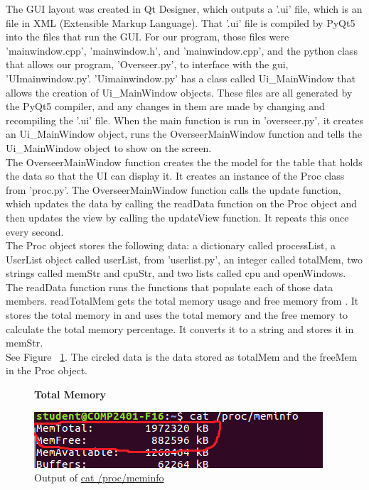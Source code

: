 \documentclass[12pt]{article}
\begin{document}
The GUI layout was created in Qt Designer, which outputs a '.ui' file, which is an file in XML (Extensible Markup Language).
That '.ui' file is compiled by PyQt5 into the files that run the GUI.
For our program, those files were 'mainwindow.cpp', 'mainwindow.h', and 'mainwindow.cpp', and the python class that allows our program, 'Overseer.py', to interface with the gui, 'UImainwindow.py'.
'Uimainwindow.py' has a class called Ui\_MainWindow that allows the creation of Ui\_MainWindow objects.
These files are all generated by the PyQt5 compiler, and any changes in them are made by changing and recompiling the '.ui' file.
When the main function is run in 'overseer.py', it creates an Ui\_MainWindow object, runs the OverseerMainWindow function and tells the Ui\_MainWindow object to show on the screen.\\
The OverseerMainWindow function creates the the model for the table that holds the data so that the UI can display it.
It creates an instance of the Proc class from 'proc.py'.
The OverseerMainWindow function calls the update function, which updates the data by calling the readData function on the Proc object and then updates the view by calling the updateView function.
It repeats this once every second.\\
The Proc object stores the following data: a dictionary called processList, a UserList object called userList, from 'userlist.py', an integer called totalMem, two strings called memStr and cpuStr, and two lists called cpu and openWindows.\\
The readData function runs the functions that populate each of those data members.
readTotalMem gets the total memory usage and free memory from . It stores the total memory in and uses the total memory and the free memory to calculate the total memory percentage. It converts it to a string and stores it in memStr.\\
See Figure ~\ref{figTotalMem}.
The circled data is the data stored as totalMem and the freeMem in the Proc object.\\
\begin{figure}[h]
	\centering
	\textbf{Total Memory}\par\medskip
	\includegraphics{totalMem}
	\caption{Output of \url{cat /proc/meminfo}}
	\label{figTotalMem}
\end{figure}
\end{document}
